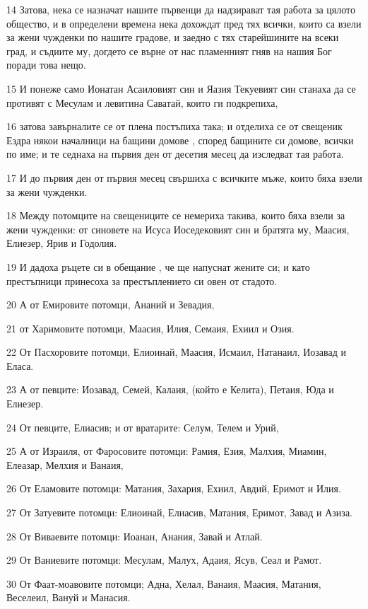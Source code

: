 \par 14 Затова, нека се назначат нашите първенци да надзирават тая работа за цялото общество, и в определени времена нека дохождат пред тях всички, които са взели за жени чужденки по нашите градове, и заедно с тях старейшините на всеки град, и съдиите му, догдето се върне от нас пламенният гняв на нашия Бог поради това нещо.
\par 15 И понеже само Ионатан Асаиловият син и Яазия Текуевият син станаха да се противят с Месулам и левитина Саватай, които ги подкрепиха,
\par 16 затова завърналите се от плена постъпиха така; и отделиха се от свещеник Ездра някои началници на бащини домове , според бащините си домове, всички по име; и те седнаха на първия ден от десетия месец да изследват тая работа.
\par 17 И до първия ден от първия месец свършиха с всичките мъже, които бяха взели за жени чужденки.
\par 18 Между потомците на свещениците се немериха такива, които бяха взели за жени чужденки: от синовете на Исуса Иоседековият син и братята му, Маасия, Елиезер, Ярив и Годолия.
\par 19 И дадоха ръцете си в обещание , че ще напуснат жените си; и като престъпници принесоха за престъплението си овен от стадото.
\par 20 А от Емировите потомци, Ананий и Зевадия,
\par 21 от Харимовите потомци, Маасия, Илия, Семаия, Ехиил и Озия.
\par 22 От Пасхоровите потомци, Елиоинай, Маасия, Исмаил, Натанаил, Иозавад и Еласа.
\par 23 А от певците: Иозавад, Семей, Калаия, (който е Келита), Петаия, Юда и Елиезер.
\par 24 От певците, Елиасив; и от вратарите: Селум, Телем и Урий,
\par 25 А от Израиля, от Фаросовите потомци: Рамия, Езия, Малхия, Миамин, Елеазар, Мелхия и Ванаия,
\par 26 От Еламовите потомци: Матания, Захария, Ехиил, Авдий, Еримот и Илия.
\par 27 От Затуевите потомци: Елиоинай, Елиасив, Матания, Еримот, Завад и Азиза.
\par 28 От Виваевите потомци: Иоанан, Анания, Завай и Атлай.
\par 29 От Ваниевите потомци: Месулам, Малух, Адаия, Ясув, Сеал и Рамот.
\par 30 От Фаат-моавовите потомци; Адна, Хелал, Ванаия, Маасия, Матания, Веселеил, Вануй и Манасия.
